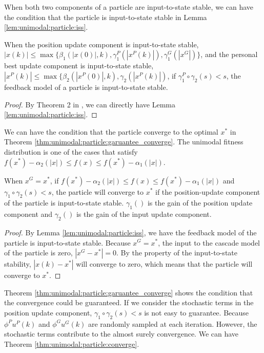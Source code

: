 When both two components of a particle are input-to-state stable, we can have the condition that the particle is input-to-state stable in Lemma \ref{lem:unimodal:particle:iss}.

\begin{mylem}
\label{lem:unimodal:particle:iss}
When the position update component is input-to-state stable,
$ | x (k) | \leq \max \{ \beta_{1} (| x(0) |, k ), \gamma^{P}_{1} ( | x^{P} (k) | ), \gamma^{G}_{1} ( | x^{G} | ) \} $,
and the personal best update component is input-to-state stable,
$ | x^{P} (k) | \leq \max \{ \beta_{2} (| x^{P}(0) |, k ), \gamma_{2} ( | x^{P} (k) | ) $,
if $ \gamma^{P}_{1} \circ \gamma_{2} (s)  < s $, the feedback model of a particle is input-to-state stable.
\begin{proof}
By Theorem 2 in \cite{Jiang2001857}, we can directly have Lemma \ref{lem:unimodal:particle:iss}.
\end{proof}
\end{mylem}

We can have the condition that the particle converge to the optimal $ x^{*} $ in Theorem \ref{thm:unimodal:particle:garuantee_converge}.
The unimodal fitness distribution is one of the cases that satisfy $ f(x^{*}) - \alpha_{2} ( |x| ) \leq  f(x) \leq f(x^{*}) - \alpha_{1} ( |x| ) $.

\begin{mythm}
\label{thm:unimodal:particle:garuantee_converge}
When $ x^{G} = x^{*} $,  if $ f(x^{*}) - \alpha_{2} ( |x| ) \leq  f(x) \leq f(x^{*}) - \alpha_{1} ( |x| ) $ and $ \gamma_{1} \circ \gamma_{2} (s)  < s $, the particle will converge to $ x^{*} $ if the position-update component of the particle is input-to-state stable.
$ \gamma_{1} () $ is the gain of the position update component and $ \gamma_{2} () $ is the gain of the input update component.
\begin{proof}
By Lemma \ref{lem:unimodal:particle:iss}, we have the feedback model of the particle is input-to-state stable.
Because $ x^{G} = x^{*} $, the input to the cascade model of the particle is zero, $ | x^{G} - x^{*} | = 0 $.
By the property of the input-to-state stability, $ | x(k) - x^{*} | $ will converge to zero, which means that the particle will converge to $ x^{*} $.
\end{proof}
\end{mythm}

Theorem \ref{thm:unimodal:particle:garuantee_converge} shows the condition that the convergence could be guaranteed.
If we consider the stochastic terms in the position update component, $ \gamma_{1} \circ \gamma_{2} (s)  < s $ is not easy to guarantee.
Because $ \phi^{P} u^{P} (k) $ and $  \phi^{G} u^{G} (k)  $ are randomly sampled at each iteration.
However, the stochastic terms contribute to the almost surely convergence.
We can have Theorem \ref{thm:unimodal:particle:converge}.

